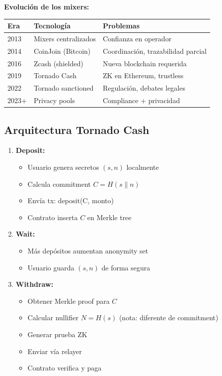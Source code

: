 \documentclass[11pt,a4paper,twoside]{book}
\begin{document}
\begin{remark}
\textbf{Evoluci\'on de los mixers:}

\begin{center}
\begin{tabular}{lll}
\toprule
\textbf{Era} & \textbf{Tecnolog\'ia} & \textbf{Problemas} \\
\midrule
2013 & Mixers centralizados & Confianza en operador \\
2014 & CoinJoin (Bitcoin) & Coordinaci\'on, trazabilidad parcial \\
2016 & Zcash (shielded) & Nueva blockchain requerida \\
2019 & Tornado Cash & ZK en Ethereum, trustless \\
2022 & Tornado sanctioned & Regulaci\'on, debates legales \\
2023+ & Privacy pools & Compliance + privacidad \\
\bottomrule
\end{tabular}
\end{center}
\end{remark}

\subsection{Arquitectura Tornado Cash}

\begin{enumerate}
    \item \textbf{Deposit:}
    \begin{itemize}
        \item Usuario genera secretos $(s, n)$ localmente
        \item Calcula commitment $C = H(s \| n)$
        \item Env\'ia tx: deposit(C, monto)
        \item Contrato inserta $C$ en Merkle tree
    \end{itemize}
    
    \item \textbf{Wait:}
    \begin{itemize}
        \item M\'as dep\'ositos aumentan anonymity set
        \item Usuario guarda $(s, n)$ de forma segura
    \end{itemize}
    
    \item \textbf{Withdraw:}
    \begin{itemize}
        \item Obtener Merkle proof para $C$
        \item Calcular nullifier $N = H(s)$ (nota: diferente de commitment)
        \item Generar prueba ZK
        \item Enviar v\'ia relayer
        \item Contrato verifica y paga
    \end{itemize}
\end{enumerate}
\end{document}
